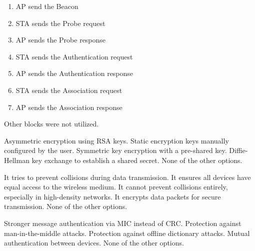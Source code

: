 \begin{questions}
    \begin{solution}
        \begin{enumerate}
            \item AP send the Beacon
            \item STA sends the Probe request
            \item AP sends the Probe response
            \item STA sends the Authentication request
            \item AP sends the Authentication response
            \item STA sends the Association request
            \item AP sends the Association response
        \end{enumerate}
        Other blocks were not utilized.
    \end{solution}

    \begin{checkboxes}
        \choice Asymmetric encryption using RSA keys.
        \choice Static encryption keys manually configured by the user.
        \choice Symmetric key encryption with a pre-shared key.
        \CorrectChoice Diffie-Hellman key exchange to establish a shared secret.
        \choice None of the other options.
    \end{checkboxes}

    \begin{checkboxes}
        \CorrectChoice It tries to prevent collisions during data transmission.
        \CorrectChoice It ensures all devices have equal access to the wireless medium.
        \CorrectChoice It cannot prevent collisions entirely, especially in high-density networks.
        \choice It encrypts data packets for secure transmission.
        \choice None of the other options.
    \end{checkboxes}


    \begin{checkboxes}
        \choice Stronger message authentication via MIC instead of CRC.
        \CorrectChoice Protection against man-in-the-middle attacks.
        \CorrectChoice Protection against offline dictionary attacks.
        \CorrectChoice Mutual authentication between devices.
        \choice None of the other options.
    \end{checkboxes}



\end{questions}

